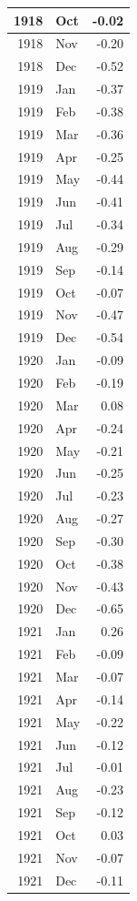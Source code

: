 \documentclass[
]{article}
\begin{document}
\begin{table}[H]
\begin{tabular}[t]{r|l|r}
\hline
1918 & Oct & -0.02\\
\hline
1918 & Nov & -0.20\\
\hline
1918 & Dec & -0.52\\
\hline
1919 & Jan & -0.37\\
\hline
1919 & Feb & -0.38\\
\hline
1919 & Mar & -0.36\\
\hline
1919 & Apr & -0.25\\
\hline
1919 & May & -0.44\\
\hline
1919 & Jun & -0.41\\
\hline
1919 & Jul & -0.34\\
\hline
1919 & Aug & -0.29\\
\hline
1919 & Sep & -0.14\\
\hline
1919 & Oct & -0.07\\
\hline
1919 & Nov & -0.47\\
\hline
1919 & Dec & -0.54\\
\hline
1920 & Jan & -0.09\\
\hline
1920 & Feb & -0.19\\
\hline
1920 & Mar & 0.08\\
\hline
1920 & Apr & -0.24\\
\hline
1920 & May & -0.21\\
\hline
1920 & Jun & -0.25\\
\hline
1920 & Jul & -0.23\\
\hline
1920 & Aug & -0.27\\
\hline
1920 & Sep & -0.30\\
\hline
1920 & Oct & -0.38\\
\hline
1920 & Nov & -0.43\\
\hline
1920 & Dec & -0.65\\
\hline
1921 & Jan & 0.26\\
\hline
1921 & Feb & -0.09\\
\hline
1921 & Mar & -0.07\\
\hline
1921 & Apr & -0.14\\
\hline
1921 & May & -0.22\\
\hline
1921 & Jun & -0.12\\
\hline
1921 & Jul & -0.01\\
\hline
1921 & Aug & -0.23\\
\hline
1921 & Sep & -0.12\\
\hline
1921 & Oct & 0.03\\
\hline
1921 & Nov & -0.07\\
\hline
1921 & Dec & -0.11\\

\end{tabular}
\end{table}
\end{document}
